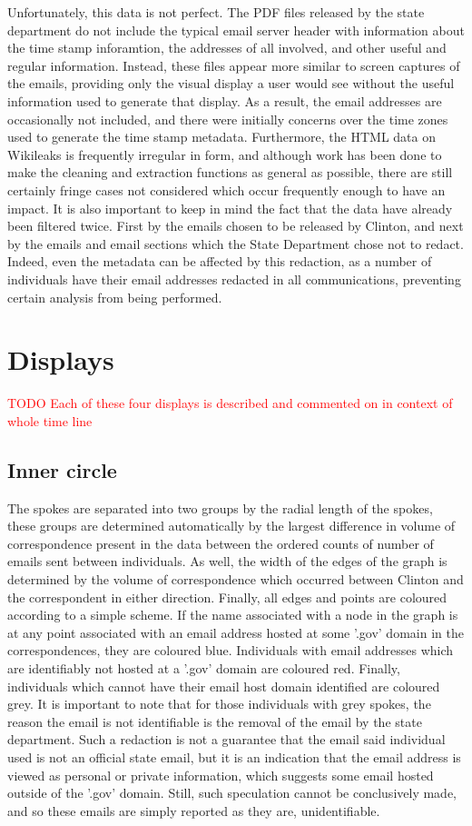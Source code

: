 \documentclass[journal]{vgtc}                %
\newcommand*{\TODO}[1]{\textcolor{red}{TODO #1}}
\begin{document}
Unfortunately, this data is not perfect. The PDF files released by the state department do not include the typical email server header with information about the time stamp inforamtion, the addresses of all involved, and other useful and regular information. Instead, these files appear more similar to screen captures of the emails, providing only the visual display a user would see without the useful information used to generate that display. As a result, the email addresses are occasionally not included, and there were initially concerns over the time zones used to generate the time stamp metadata. Furthermore, the HTML data on Wikileaks is frequently irregular in form, and although work has been done to make the cleaning and extraction functions as general as possible, there are still certainly fringe cases not considered which occur frequently enough to have an impact. It is also important to keep in mind the fact that the data have already been filtered twice. First by the emails chosen to be released by Clinton, and next by the emails and email sections which the State Department chose not to redact. Indeed, even the metadata can be affected by this redaction, as a number of individuals have their email addresses redacted in all communications, preventing certain analysis from being performed.

\section{Displays}
\TODO{Each of these four displays is described and commented on in context of whole time line}
\subsection{Inner circle} 
The spokes are separated into two groups by the radial length of the spokes, these groups are determined automatically by the largest difference in volume of correspondence present in the data between the ordered counts of number of emails sent between individuals. As well, the width of the edges of the graph is determined by the volume of correspondence which occurred between Clinton and the correspondent in either direction. Finally, all edges and points are coloured according to a simple scheme. If the name associated with a node in the graph is at any point associated with an email address hosted at some '.gov' domain in the correspondences, they are coloured blue. Individuals with email addresses which are identifiably not hosted at a '.gov' domain are coloured red. Finally, individuals which cannot have their email host domain identified are coloured grey. It is important to note that for those individuals with grey spokes, the reason the email is not identifiable is the removal of the email by the state department. Such a redaction is not a guarantee that the email said individual used is not an official state email, but it is an indication that the email address is viewed as personal or private information, which suggests some email hosted outside of the '.gov' domain. Still, such speculation cannot be conclusively made, and so these emails are simply reported as they are, unidentifiable.
\end{document}
